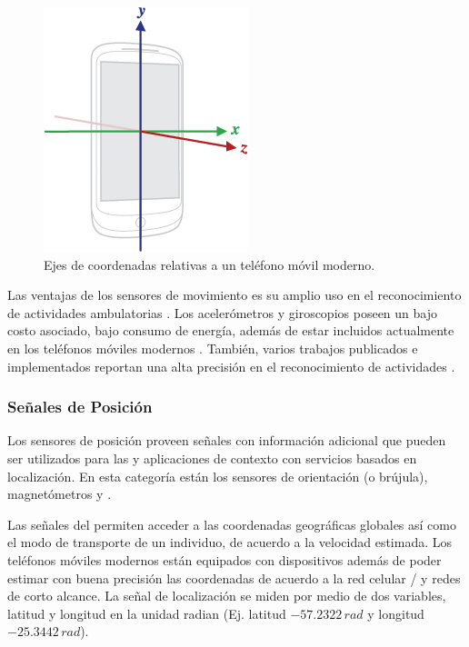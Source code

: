 \begin{figure}[!tbph]
\begin{centering}
\includegraphics[scale=0.7]{capitulo-4/graphics/axis_device}
\par\end{centering}
\caption[Sistemas de coordenadas relativo a dispositivo]{\label{fig4:axis-phone}Ejes de coordenadas relativas a un teléfono
móvil moderno.}

\end{figure}

Las ventajas de los sensores de movimiento es su amplio uso en el
reconocimiento de actividades ambulatorias \cite{Bao2004,Kwapisz2011,ReyesOrtiz2015}.
Los acelerómetros y giroscopios poseen un bajo costo asociado, bajo
consumo de energía, además de estar incluidos actualmente en los teléfonos
móviles modernos \cite{Google2016s}. También, varios trabajos publicados
e implementados reportan una alta precisión en el reconocimiento de
actividades \cite{Bao2004,LaraLabrador2012}.

\subsubsection{Señales de Posición}

Los sensores de posición proveen señales con información adicional
que pueden ser utilizados para las  y aplicaciones de contexto
con servicios basados en localización. En esta categoría están los
sensores de orientación (o brújula), magnetómetros y  \cite{Google2016s}.

Las señales del  permiten acceder a las coordenadas geográficas
globales así como el modo de transporte de un individuo, de acuerdo
a la velocidad estimada. Los teléfonos móviles modernos están equipados
con dispositivos  además de poder estimar con buena precisión
las coordenadas de acuerdo a la red celular /
y redes  de corto alcance. La señal de localización se
miden por medio de dos variables, latitud y longitud en la unidad
radian (Ej. latitud $-57.2322\,rad$ y longitud $-25.3442\,rad$).

